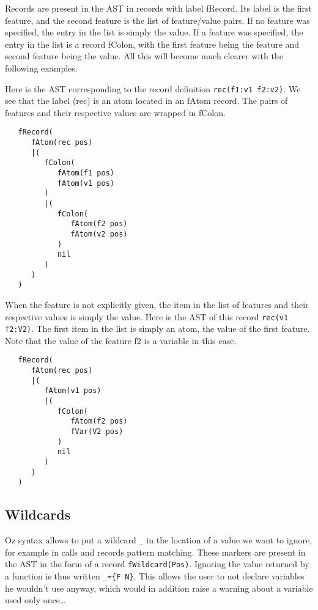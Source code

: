\documentclass[a4paper]{memoir}
\begin{document}
Records are present in the AST in records with label fRecord. Its label is the first feature, and the second feature is the list of feature/value pairs. If no feature was specified, the entry in the list is simply the value. If a feature was specified, the entry in the list is a record fColon, with the first feature being the feature and second feature being the value. All this will become much clearer with the following examples.

Here is the AST corresponding to the record definition \lstinline!rec(f1:v1 f2:v2)!. We see that the label (rec) is an atom located in an fAtom record. The pairs of features and their respective values are wrapped in fColon.

\begin{lstlisting}
   fRecord(
      fAtom(rec pos)
      |(
         fColon(
            fAtom(f1 pos)
            fAtom(v1 pos)
         )
         |(
            fColon(
               fAtom(f2 pos)
               fAtom(v2 pos)
            )
            nil
         )
      )
   )
\end{lstlisting}

When the feature is not explicitly given, the item in the list of features and their respective values is simply the value. Here is the AST of this record \lstinline!rec(v1 f2:V2)!. The first item in the list is simply an atom, the value of the first feature. Note that the value of the feature f2 is a variable in this case.

\begin{lstlisting}
   fRecord(
      fAtom(rec pos)
      |(
         fAtom(v1 pos)
         |(
            fColon(
               fAtom(f2 pos)
               fVar(V2 pos)
            )
            nil
         )
      )
   )
\end{lstlisting}


\subsection{Wildcards}\label{sec:input:wildcard}
Oz syntax allows to put a wildcard \lstinline!_! in the location of a value we want to ignore, for example in calls and records pattern matching. These markers are present in the AST in the form of a record \lstinline!fWildcard(Pos)!.
Ignoring the value returned by a function is thus written \lstinline!_={F N}!. 
This allows the user to not declare variables he wouldn't use anyway, which would in addition raise a warning about a variable used only once\ldots
\end{document}
